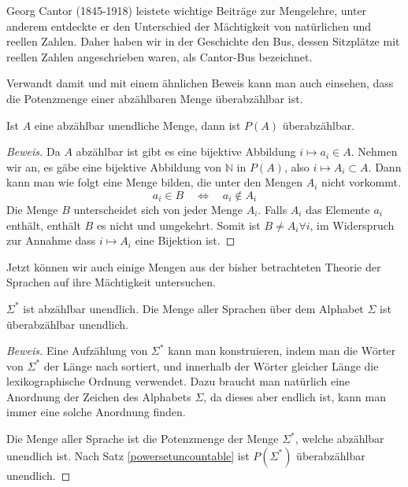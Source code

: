 %
Georg Cantor (1845-1918) leistete wichtige Beiträge zur Mengelehre,
unter anderem entdeckte er den Unterschied der Mächtigkeit von
natürlichen und reellen Zahlen. Daher haben wir in der Geschichte
den Bus, dessen Sitzplätze mit reellen Zahlen angeschrieben waren,
als Cantor-Bus bezeichnet.

Verwandt damit und mit einem ähnlichen Beweis kann man auch einsehen,
dass die Potenzmenge einer abzählbaren Menge überabzählbar ist.

\begin{satz}\label{powersetuncountable}
Ist $A$ eine abzählbar unendliche Menge, dann ist $P(A)$
überabzählbar.
\end{satz}

\begin{proof}[Beweis]
Da $A$ abzählbar ist gibt es eine bijektive Abbildung
$i\mapsto a_i\in A$. Nehmen wir an, es gäbe eine bijektive
Abbildung von $\mathbb N$ in $P(A)$, also $i\mapsto A_i\subset A$.
Dann kann man wie folgt eine Menge bilden, die unter den Mengen
$A_i$ nicht vorkommt.
\[
a_i\in B\quad\Leftrightarrow\quad a_i\not\in A_i
\]
Die Menge $B$ unterscheidet sich von jeder Menge $A_i$. Falls
$A_i$ das Elemente $a_i$ enthält, enthält $B$ es nicht und
umgekehrt. Somit ist $B\ne A_i\forall i$, im Widerspruch zur Annahme
dass $i\mapsto A_i$ eine Bijektion ist.
\end{proof}

Jetzt können wir auch einige Mengen aus der bisher betrachteten
Theorie der Sprachen auf ihre Mächtigkeit untersuchen.

\begin{satz}
$\Sigma^*$ ist abzählbar unendlich. Die Menge aller Sprachen über dem
Alphabet $\Sigma$ ist überabzählbar unendlich.
\end{satz}

\begin{proof}[Beweis]
Eine Aufzählung von $\Sigma^*$ kann man konstruieren, indem man
die Wörter von $\Sigma^*$ der Länge nach sortiert, und innerhalb
der Wörter gleicher Länge die lexikographische Ordnung verwendet.
Dazu braucht man natürlich eine Anordnung der Zeichen des Alphabets $\Sigma$,
da dieses aber endlich ist, kann man immer eine solche Anordnung finden.

Die Menge aller Sprache ist die Potenzmenge der Menge $\Sigma^*$, welche
abzählbar unendlich ist. Nach Satz \ref{powersetuncountable} ist
$P(\Sigma^*)$ überabzählbar unendlich.
\end{proof}

